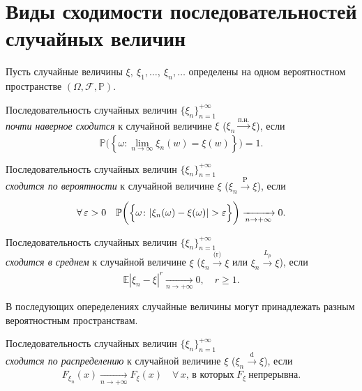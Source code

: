 \section{Виды сходимости последовательностей случайных величин}
Пусть случайные величины $\xi, \: \xi_1, \ldots, \: \xi_n, \ldots$ определены на одном вероятностном пространстве $\left(\Omega, \mathcal{F}, \mathbb{P}\right)$.

\begin{defn}
    Последовательность случайных величин $\{\xi_n\}_{n = 1}^{+\infty}$ \\ 
    \textit{почти наверное сходится} к случайной величине $\xi$ ($\xi_n \xrightarrow[]{\text{п.н.}} \xi$), если
    \begin{equation*}
        \mathbb{P}\biggl(\left\{\omega \colon \lim\limits _{n \rightarrow \infty} \xi_{n}(w)=\xi(w)\right\}\biggr)=1.
    \end{equation*}
\end{defn}

\begin{defn}
    Последовательность случайных величин $\{\xi_n\}_{n = 1}^{+\infty}$ \\
    \textit{сходится по вероятности} к случайной величине $\xi$ ($\xi_n \xrightarrow[]{\text{P}} \xi$), если
    \begin{equation*}
        \forall \, \varepsilon>0 \quad \mathbb{P} \biggl( \Bigl\{ \omega \colon |\xi_{n}(\omega)-\xi(\omega)|>\varepsilon \Bigr\} \biggr) \xrightarrow[n \to +\infty]{} 0.
    \end{equation*}
\end{defn}

\begin{defn}
    Последовательность случайных величин $\{\xi_n\}_{n=1}^{+\infty}$ \\
    \textit{сходится в среднем} к случайной величине $\xi$ ($\xi_n \xrightarrow[]{\text{(r)}} \xi$ или $\xi_n \xrightarrow[]{L_p} \xi$), если
    \begin{equation*}
        \mathbb{E}\left|\xi_{n}-\xi\right|^{r} \xrightarrow[n \to +\infty]{} 0, \quad r \geqslant 1.
    \end{equation*}
\end{defn}

В последующих опеределениях случайные величины могут принадлежать разным вероятностным пространствам.
\begin{defn}
    Последовательность случайных величин $\{\xi_n\}_{n=1}^{+\infty}$ \\
    \textit{сходится по распределению} к случайной величине $\xi$ ($\xi_n \xrightarrow[]{\text{d}} \xi$), если
    \begin{equation*}
        F_{\xi_n}(x) \xrightarrow[n \to +\infty]{} F_{\xi}(x) \quad \forall \, x, \, \text{в которых}~ F_{\xi} ~\text{непрерывна}.
    \end{equation*}
\end{defn}

